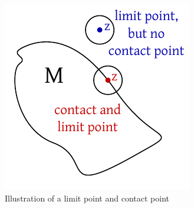 \documentclass[a4paper,landscape,twocolumn]{article}
\theoremstyle{definition}
\begin{document}
\begin{figure}
  \begin{center}
    \includegraphics{img/illustration_of_a_limit_contact_point.pdf}
    \caption{Illustration of a limit point and contact point}
    \label{img:lim_contact_pt}
  \end{center}
\end{figure}
\end{document}
